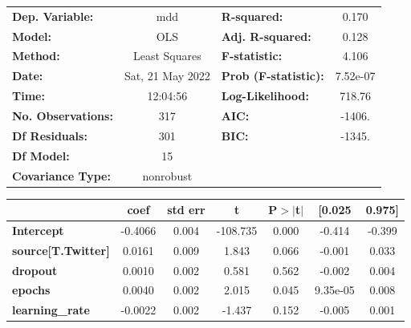 \begin{center}
\begin{tabular}{lclc}
\toprule
\textbf{Dep. Variable:}              &       mdd        & \textbf{  R-squared:         } &     0.170   \\
\textbf{Model:}                      &       OLS        & \textbf{  Adj. R-squared:    } &     0.128   \\
\textbf{Method:}                     &  Least Squares   & \textbf{  F-statistic:       } &     4.106   \\
\textbf{Date:}                       & Sat, 21 May 2022 & \textbf{  Prob (F-statistic):} &  7.52e-07   \\
\textbf{Time:}                       &     12:04:56     & \textbf{  Log-Likelihood:    } &    718.76   \\
\textbf{No. Observations:}           &         317      & \textbf{  AIC:               } &    -1406.   \\
\textbf{Df Residuals:}               &         301      & \textbf{  BIC:               } &    -1345.   \\
\textbf{Df Model:}                   &          15      & \textbf{                     } &             \\
\textbf{Covariance Type:}            &    nonrobust     & \textbf{                     } &             \\
\bottomrule
\end{tabular}
\begin{tabular}{lcccccc}
                                     & \textbf{coef} & \textbf{std err} & \textbf{t} & \textbf{P$> |$t$|$} & \textbf{[0.025} & \textbf{0.975]}  \\
\midrule
\textbf{Intercept}                   &      -0.4066  &        0.004     &  -108.735  &         0.000        &       -0.414    &       -0.399     \\
\textbf{source[T.Twitter]}           &       0.0161  &        0.009     &     1.843  &         0.066        &       -0.001    &        0.033     \\
\textbf{dropout}                     &       0.0010  &        0.002     &     0.581  &         0.562        &       -0.002    &        0.004     \\
\textbf{epochs}                      &       0.0040  &        0.002     &     2.015  &         0.045        &     9.35e-05    &        0.008     \\
\textbf{learning\_rate}              &      -0.0022  &        0.002     &    -1.437  &         0.152        &       -0.005    &        0.001     \\

\end{tabular}
\end{center}
